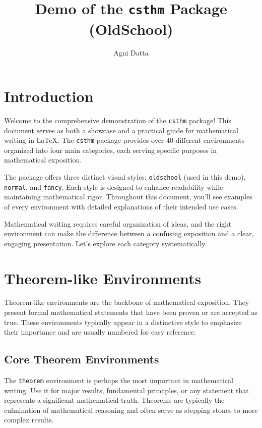 \documentclass[9pt]{amsart}
\title{Demo of the \texttt{csthm} Package (OldSchool)}
\author{Agni Datta}
\begin{document}
\maketitle

\tableofcontents

\section{Introduction}

Welcome to the comprehensive demonstration of the \texttt{csthm} package! This
document serves as both a showcase and a practical guide for mathematical
writing in \LaTeX. The \texttt{csthm} package provides over 40 different
environments organized into four main categories, each serving specific
purposes in mathematical exposition.

The package offers three distinct visual styles: \texttt{oldschool} (used in
this demo), \texttt{normal}, and \texttt{fancy}. Each style is designed to
enhance readability while maintaining mathematical rigor. Throughout this
document, you'll see examples of every environment with detailed explanations
of their intended use cases.

Mathematical writing requires careful organization of ideas, and the right
environment can make the difference between a confusing exposition and a clear,
engaging presentation. Let's explore each category systematically.

\section{Theorem-like Environments}

Theorem-like environments are the backbone of mathematical exposition. They
present formal mathematical statements that have been proven or are accepted as
true. These environments typically appear in a distinctive style to emphasize
their importance and are usually numbered for easy reference.

\subsection{Core Theorem Environments}

The \texttt{theorem} environment is perhaps the most important in mathematical
writing. Use it for major results, fundamental principles, or any statement
that represents a significant mathematical truth. Theorems are typically the
culmination of mathematical reasoning and often serve as stepping stones to
more complex results.
\end{document}
